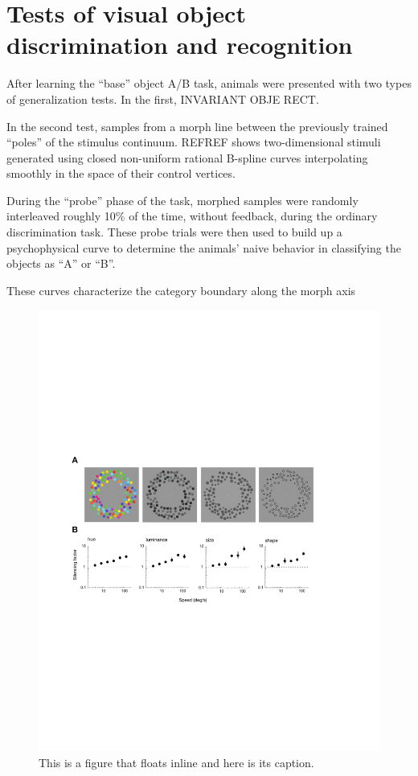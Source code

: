 
\section{Tests of visual object discrimination and recognition}

After learning the ``base'' object A/B task, animals were presented with two types of generalization tests. In the first, INVARIANT OBJE RECT.

In the second test, samples from a morph line between the previously trained ``poles'' of the stimulus continuum. REFREF shows two-dimensional stimuli generated using closed non-uniform rational B-spline curves interpolating smoothly in the space of their control vertices. 

During the ``probe'' phase of the task, morphed samples were randomly interleaved roughly 10\% of the time, without feedback, during the ordinary discrimination task. These probe trials were then used to build up a psychophysical curve to determine the animals' naive behavior in classifying the objects as ``A'' or ``B''. 

These curves characterize the category boundary along the morph axis 


\begin{figure}
\includegraphics[width=\textwidth]{figures/fig1}
\caption[Short figure name.]{This is a figure that floats inline and here is its caption.
\label{fig:myInlineFigure}}
\end{figure}

